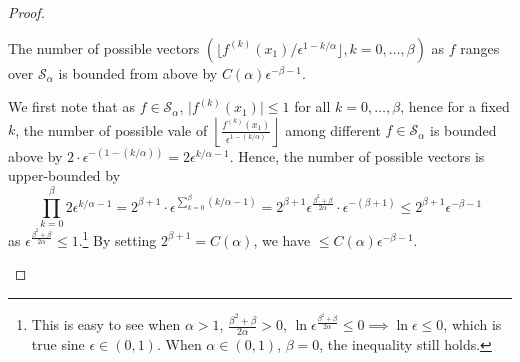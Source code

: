 \begin{proof}
	\begin{claim}\label{clm:metric-entropy-b}
		The number of possible vectors \((\lfloor f^{(k)} (x_1) / \epsilon ^{1 - k / \alpha } \rfloor, k = 0, \dots , \beta )\) as \(f\) ranges over \(\mathcal{S} _\alpha \) is bounded from above by \(C(\alpha ) \epsilon ^{-\beta - 1}\).
	\end{claim}
	\begin{explanation}
		We first note that as \(f\in \mathcal{S} _\alpha \), \(\vert f^{(k)} (x_1) \vert \leq 1\) for all \(k = 0, \dots , \beta \), hence for a fixed \(k\), the number of possible vale of \(\left\lfloor \frac{f^{(k)}(x_1)}{\epsilon ^{1 - (k / \alpha )}} \right\rfloor\) among different \(f\in \mathcal{S} _\alpha \) is bounded above by \(2\cdot \epsilon ^{- (1 - (k / \alpha ))} = 2 \epsilon ^{k / \alpha - 1}\). Hence, the number of possible vectors is upper-bounded by
		\[
			\prod _{k = 0}^{\beta } 2 \epsilon ^{k / \alpha - 1}
			= 2^{\beta +1} \cdot \epsilon ^{\sum_{k=0}^{\beta } (k / \alpha - 1)}
			= 2^{\beta +1} \epsilon ^{\frac{\beta ^2 + \beta }{2\alpha }} \cdot \epsilon^{- (\beta + 1)}
			\leq 2^{\beta +1} \epsilon^{- \beta - 1}
		\]
		as \(\epsilon ^{\frac{\beta ^2 + \beta }{2\alpha }} \leq 1\).\footnote{This is easy to see when \(\alpha > 1\), \(\frac{\beta ^2 + \beta }{2\alpha }> 0\), \(\ln \epsilon^{\frac{\beta ^2 + \beta }{2\alpha }} \leq 0 \implies \ln \epsilon \leq 0\), which is true sine \(\epsilon \in (0, 1)\). When \(\alpha \in (0, 1)\), \(\beta = 0\), the inequality still holds.} By setting \(2^{\beta + 1} = C(\alpha )\), we have \(\leq C(\alpha )\epsilon ^{-\beta -1}\).
	\end{explanation}


\end{proof}
